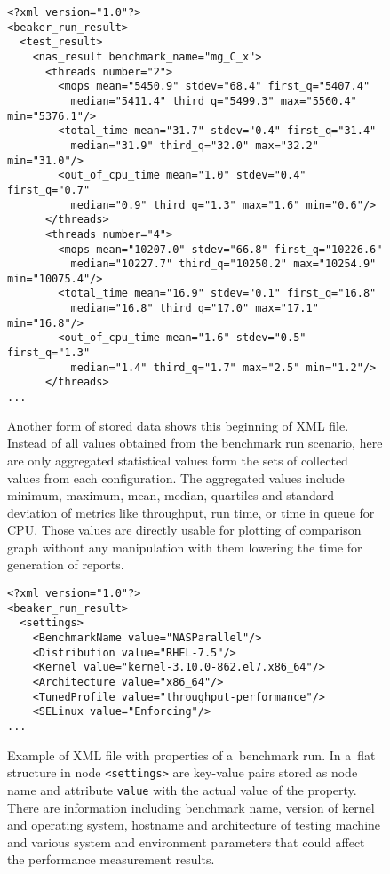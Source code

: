 \begin{figure}
  \small
  \begin{verbatim}
<?xml version="1.0"?>
<beaker_run_result>
  <test_result>
    <nas_result benchmark_name="mg_C_x">
      <threads number="2">
        <mops mean="5450.9" stdev="68.4" first_q="5407.4"
          median="5411.4" third_q="5499.3" max="5560.4" min="5376.1"/>
        <total_time mean="31.7" stdev="0.4" first_q="31.4"
          median="31.9" third_q="32.0" max="32.2" min="31.0"/>
        <out_of_cpu_time mean="1.0" stdev="0.4" first_q="0.7"
          median="0.9" third_q="1.3" max="1.6" min="0.6"/>
      </threads>
      <threads number="4">
        <mops mean="10207.0" stdev="66.8" first_q="10226.6"
          median="10227.7" third_q="10250.2" max="10254.9" min="10075.4"/>
        <total_time mean="16.9" stdev="0.1" first_q="16.8"
          median="16.8" third_q="17.0" max="17.1" min="16.8"/>
        <out_of_cpu_time mean="1.6" stdev="0.5" first_q="1.3"
          median="1.4" third_q="1.7" max="2.5" min="1.2"/>
      </threads>
...
\end{verbatim}
  \normalsize
  \caption{Another form of stored data shows this beginning of XML file. Instead
    of all values obtained from the benchmark run scenario, here are only
    aggregated statistical values form the sets of collected values from each
    configuration. The aggregated values include minimum, maximum, mean, median,
    quartiles and standard deviation of metrics like throughput, run time, or
    time in queue for CPU. Those values are directly usable for plotting of
    comparison graph without any manipulation with them lowering the time for
    generation of reports.}
  \label{fig:xml_sums}
\end{figure}

\begin{figure}
  \small
\begin{verbatim}
<?xml version="1.0"?>
<beaker_run_result>
  <settings>
    <BenchmarkName value="NASParallel"/>
    <Distribution value="RHEL-7.5"/>
    <Kernel value="kernel-3.10.0-862.el7.x86_64"/>
    <Architecture value="x86_64"/>
    <TunedProfile value="throughput-performance"/>
    <SELinux value="Enforcing"/>
...
\end{verbatim}
  \normalsize
  \caption{Example of XML file with properties of a~benchmark run. In a~flat
    structure in node \texttt{<settings>} are key-value pairs stored as node
    name and attribute \texttt{value} with the actual value of the property.
    There are information including benchmark name, version of kernel and
    operating system, hostname and architecture of testing machine and various
    system and environment parameters that could affect the performance
    measurement results.}
  \label{fig:xml_config}
\end{figure}

